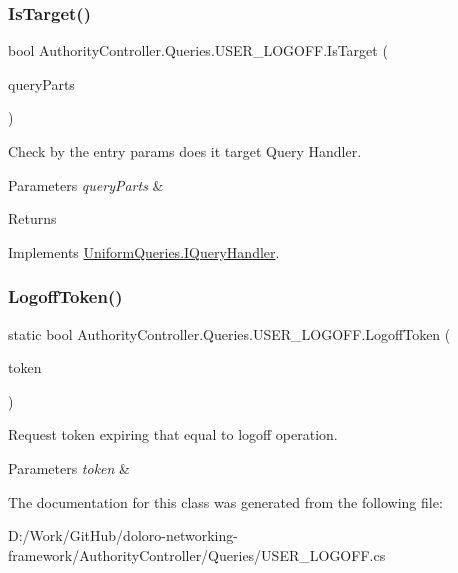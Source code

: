 \subsubsection{\texorpdfstring{Is\+Target()}{IsTarget()}}
{\footnotesize\ttfamily bool Authority\+Controller.\+Queries.\+U\+S\+E\+R\+\_\+\+L\+O\+G\+O\+F\+F.\+Is\+Target (\begin{DoxyParamCaption}\item[{\mbox{\hyperlink{struct_uniform_queries_1_1_query_part}{Query\+Part}} \mbox{[}$\,$\mbox{]}}]{query\+Parts }\end{DoxyParamCaption})}



Check by the entry params does it target Query Handler. 


\begin{DoxyParams}{Parameters}
{\em query\+Parts} & \\
\hline
\end{DoxyParams}
\begin{DoxyReturn}{Returns}

\end{DoxyReturn}


Implements \mbox{\hyperlink{interface_uniform_queries_1_1_i_query_handler_abda1ccf47ad2889fbd015955965046e7}{Uniform\+Queries.\+I\+Query\+Handler}}.

\mbox{\label{class_authority_controller_1_1_queries_1_1_u_s_e_r___l_o_g_o_f_f_aee1aba51496e1412706f77c53650955a}} 
\subsubsection{\texorpdfstring{Logoff\+Token()}{LogoffToken()}}
{\footnotesize\ttfamily static bool Authority\+Controller.\+Queries.\+U\+S\+E\+R\+\_\+\+L\+O\+G\+O\+F\+F.\+Logoff\+Token (\begin{DoxyParamCaption}\item[{string}]{token }\end{DoxyParamCaption})\hspace{0.3cm}{\ttfamily [static]}}



Request token expiring that equal to logoff operation. 


\begin{DoxyParams}{Parameters}
{\em token} & \\
\hline
\end{DoxyParams}


The documentation for this class was generated from the following file\+:\begin{DoxyCompactItemize}
\item 
D\+:/\+Work/\+Git\+Hub/doloro-\/networking-\/framework/\+Authority\+Controller/\+Queries/U\+S\+E\+R\+\_\+\+L\+O\+G\+O\+F\+F.\+cs\end{DoxyCompactItemize}
